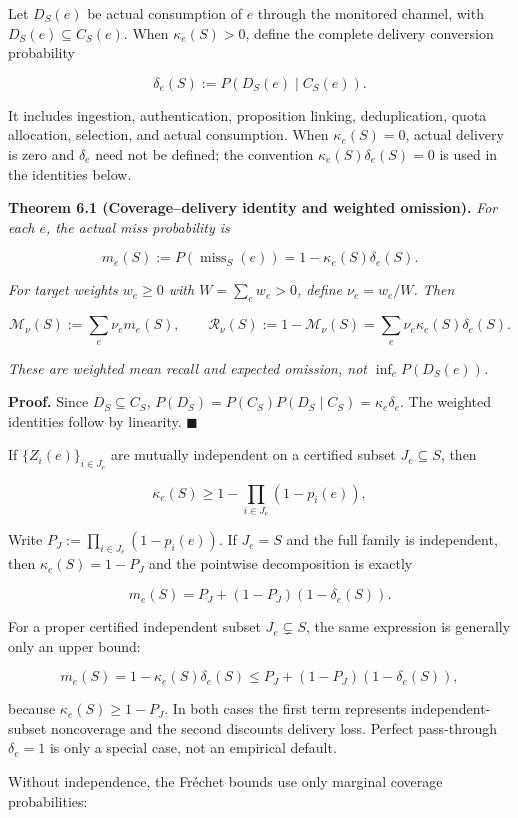 \documentclass[
  11pt]{article}
\begin{document}
Let \(D_S(e)\) be actual consumption of \(e\) through the monitored
channel, with \(D_S(e)\subseteq C_S(e)\). When \(\kappa_e(S)>0\), define
the complete delivery conversion probability

\[\delta_e(S):=P(D_S(e)\mid C_S(e)).\]

It includes ingestion, authentication, proposition linking,
deduplication, quota allocation, selection, and actual consumption. When
\(\kappa_e(S)=0\), actual delivery is zero and \(\delta_e\) need not be
defined; the convention \(\kappa_e(S)\delta_e(S)=0\) is used in the
identities below.

\textbf{Theorem 6.1 (Coverage--delivery identity and weighted
omission).} \emph{For each \(e\), the actual miss probability is}

\[m_e(S):=P(\operatorname{miss}_S(e))=1-\kappa_e(S)\delta_e(S).\]

\emph{For target weights \(w_e\ge0\) with \(W=\sum_ew_e>0\), define
\(\nu_e=w_e/W\). Then}

\[\mathcal M_\nu(S):=\sum_e\nu_em_e(S),\qquad \mathcal R_\nu(S):=1-\mathcal M_\nu(S)=\sum_e\nu_e\kappa_e(S)\delta_e(S).\]

\emph{These are weighted mean recall and expected omission, not
\(\inf_e P(D_S(e))\).}

\textbf{Proof.} Since \(D_S\subseteq C_S\),
\(P(D_S)=P(C_S)P(D_S\mid C_S)=\kappa_e\delta_e\). The weighted
identities follow by linearity. \(\blacksquare\)

If \(\{Z_i(e)\}_{i\in J_e}\) are mutually independent on a certified
subset \(J_e\subseteq S\), then

\[\kappa_e(S)\ge1-\prod_{i\in J_e}(1-p_i(e)),\]

Write \(P_J:=\prod_{i\in J_e}(1-p_i(e))\). If \(J_e=S\) and the full
family is independent, then \(\kappa_e(S)=1-P_J\) and the pointwise
decomposition is exactly

\[m_e(S)=P_J+(1-P_J)(1-\delta_e(S)).\]

For a proper certified independent subset \(J_e\subsetneq S\), the same
expression is generally only an upper bound:

\[m_e(S)=1-\kappa_e(S)\delta_e(S)\le P_J+(1-P_J)(1-\delta_e(S)),\]

because \(\kappa_e(S)\ge1-P_J\). In both cases the first term represents
independent-subset noncoverage and the second discounts delivery loss.
Perfect pass-through \(\delta_e=1\) is only a special case, not an
empirical default.

Without independence, the Fréchet bounds use only marginal coverage
probabilities:
\end{document}
